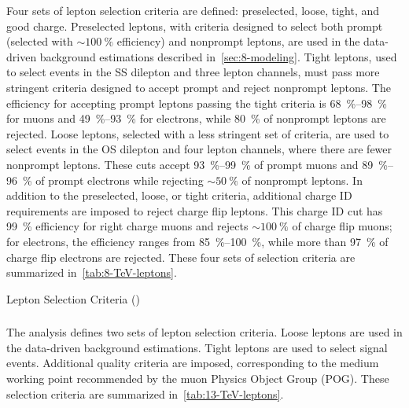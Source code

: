 Four sets of lepton selection criteria are defined: preselected, loose, tight,
and good charge. Preselected leptons, with criteria designed to select both
prompt (selected with $\sim \SI{100}{\percent}$ efficiency) and nonprompt
leptons, are used in the data-driven background estimations described
in~\cref{sec:8-modeling}. Tight leptons, used to select events in the SS
dilepton and three lepton channels, must pass more stringent criteria designed
to accept prompt and reject nonprompt leptons. The efficiency for accepting
prompt leptons passing the tight criteria is \SIrange{68}{98}{\percent} for
muons and \SIrange{49}{93}{\percent} for electrons, while \SI{80}{\percent} of
nonprompt leptons are rejected. Loose leptons, selected with a less stringent
set of criteria, are used to select events in the OS dilepton and four lepton
channels, where there are fewer nonprompt leptons. These cuts accept
\SIrange{93}{99}{\percent} of prompt muons and \SIrange{89}{96}{\percent} of
prompt electrons while rejecting $\sim \SI{50}{\percent}$ of nonprompt leptons.
In addition to the preselected, loose, or tight criteria, additional charge ID
requirements are imposed to reject charge flip leptons. This charge ID cut has
\SI{99}{\percent} efficiency for right charge muons and rejects $\sim
\SI{100}{\percent}$ of charge flip muons; for electrons, the efficiency ranges
from \SIrange{85}{100}{\percent}, while more than \SI{97}{\percent} of charge
flip electrons are rejected. These four sets of selection criteria are
summarized in~\cref{tab:8-TeV-leptons}.
\begin{table}
  \centering
  \caption[Lepton Selection Criteria (\eightTeV)]{
    Lepton Selection Criteria (\eightTeV)
  }
  
  \label{tab:8-TeV-leptons}
\end{table}

\begin{table}
  
\end{table}

\subsubsection{\thirteenTeV}
\label{subsec:13_lep_selection}
The \thirteenTeV analysis defines two sets of lepton selection criteria. Loose
leptons are used in the data-driven background estimations. Tight leptons are
used to select signal events. Additional quality criteria are imposed,
corresponding to the medium working point recommended by the muon Physics Object
Group (POG). These selection criteria are summarized
in~\cref{tab:13-TeV-leptons}.


